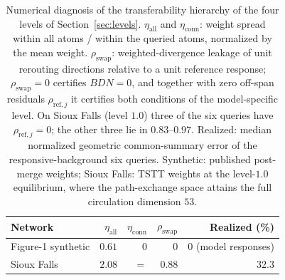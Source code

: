 \begin{table}[t]\centering\footnotesize
\caption{Numerical diagnosis of the transferability hierarchy of
the four levels of Section~\ref{sec:levels}. $\eta_{\mathrm{all}}$ and
$\eta_{\mathrm{conn}}$: weight spread within all atoms / within the
queried atoms, normalized by the mean weight. $\rho_{\mathrm{swap}}$:
weighted-divergence leakage of unit rerouting directions relative to a
unit reference response; $\rho_{\mathrm{swap}}=0$ certifies
$BDN=0$, and together with zero off-span residuals
$\rho_{\mathrm{ref},j}$ it certifies both conditions of the
model-specific level. On Sioux Falls (level $1.0$) three of the six
queries have $\rho_{\mathrm{ref},j}=0$; the other three lie in
$0.83$--$0.97$. Realized: median
normalized geometric common-summary error of the responsive-background six
queries. Synthetic: published post-merge weights; Sioux Falls: TSTT
weights at the level-$1.0$ equilibrium, where the path-exchange space
attains the full circulation dimension $53$.}\label{tab:levelsdiag}
\begin{tabular}{lrrrr}\toprule
Network & $\eta_{\mathrm{all}}$ & $\eta_{\mathrm{conn}}$ & $\rho_{\mathrm{swap}}$ & Realized (\%)\\\midrule
Figure-1 synthetic & $0.61$ & $0$ & $0$ & $0$ (model responses)\\
Sioux Falls & $2.08$ & $=$ & $0.88$ & $32.3$\\
\bottomrule\end{tabular}\end{table}
